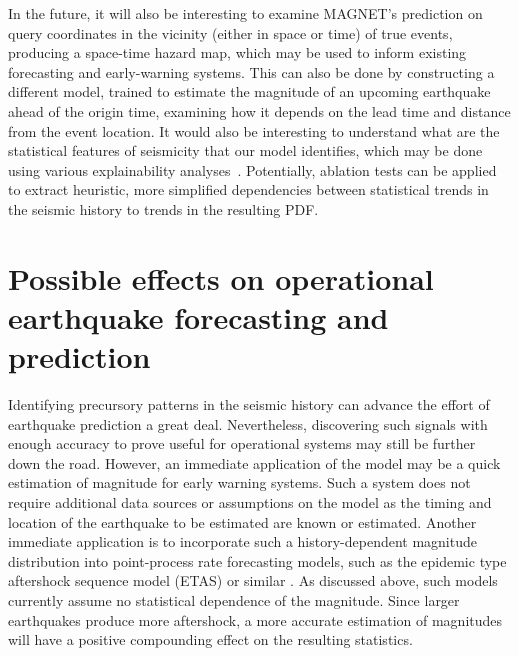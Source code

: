 \documentclass[pdflatex]{sn-jnl}
\newcommand{\neri}[1]{{\textcolor{cyan}{#1}}}
\begin{document}
In the future, it will also be interesting to examine MAGNET's prediction on query coordinates in the vicinity (either in space or time) of true events, producing a space-time hazard map, which may be used to inform existing forecasting and early-warning systems. This can also be done by constructing a different model, trained to estimate the magnitude of an upcoming earthquake ahead of the origin time, examining how it depends on the lead time and distance from the event location. 
It would also be interesting to understand what are the statistical features of seismicity that our model identifies, which may be done using various explainability analyses~\cite{sturmfels_visualizing_2020, zhang_survey_2021, liu_interpretable_2023}. Potentially, ablation tests \cite{meyes_ablation_2019, sturmfels_visualizing_2020} can be applied to extract heuristic, more simplified dependencies between statistical trends in the seismic history to trends in the resulting PDF.


\section{Possible effects on operational earthquake forecasting and prediction}
Identifying precursory patterns in the seismic history can advance the effort of earthquake prediction a great deal\cite{mousavi_deep-learning_2022, mousavi_machine_2023, mignan_neural_2020, karimpouli_explainable_2023, bergen_machine_2019}. Nevertheless, discovering such signals with enough accuracy to prove useful for operational systems may still be further down the road.
However, an immediate application of the model may be a quick estimation of magnitude for early warning systems. Such a system does not require additional data sources or assumptions on the model as the timing and location of the earthquake to be estimated are known or estimated. 
Another immediate application is to incorporate such a history-dependent magnitude distribution into point-process rate forecasting models, such as the epidemic type aftershock sequence model (ETAS) or similar \cite{ogata_statistical_1988, ogata_statistics_2017, dascher-cousineau_using_2023}. As discussed above, such models currently assume no statistical dependence of the magnitude. Since larger earthquakes produce more aftershock, a more accurate estimation of magnitudes will have a positive compounding effect on the resulting statistics.

\end{document}
